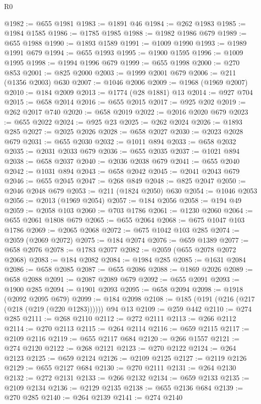 \begin{lexlean}{R0}
\begin{coremodule}
@1982 := @655 @1981
@1983 := @1891 @46
@1984 := @262 @1983
@1985 := @1984 @1585
@1986 := @1785 @1985
@1988 := @1982 @1986 @679
@1989 := @655 @1988
@1990 := @1893 @1589
@1991 := @1009 @1990
@1993 := @1989 @1991 @679
@1994 := @655 @1993
@1995 := @1900 @1595
@1996 := @1009 @1995
@1998 := @1994 @1996 @679
@1999 := @655 @1998
@2000 := @270 @853
@2001 := @825 @2000
@2003 := @1999 @2001 @679
@2006 := @211 (@1356 @2003) @630
@2007 := @1046 @2006
@2009 := @1968 (@1969 @2007)
@2010 := @184 @2009
@2013 := @1774 (@28 @1881) @13
@2014 := @927 @704
@2015 := @658 @2014
@2016 := @655 @2015
@2017 := @925 @202
@2019 := @262 @2017 @740
@2020 := @658 @2019
@2022 := @2016 @2020 @679
@2023 := @655 @2022
@2024 := @925 @23
@2025 := @262 @2024
@2026 := @1893 @285
@2027 := @2025 @2026
@2028 := @658 @2027
@2030 := @2023 @2028 @679
@2031 := @655 @2030
@2032 := @1011 @894
@2033 := @658 @2032
@2035 := @2031 @2033 @679
@2036 := @655 @2035
@2037 := @1021 @894
@2038 := @658 @2037
@2040 := @2036 @2038 @679
@2041 := @655 @2040
@2042 := @1031 @894
@2043 := @658 @2042
@2045 := @2041 @2043 @679
@2046 := @655 @2045
@2047 := @268 @849
@2048 := @825 @2047
@2050 := @2046 @2048 @679
@2053 := @211 (@1824 @2050) @630
@2054 := @1046 @2053
@2056 := @2013 (@1969 @2054)
@2057 := @184 @2056
@2058 := @194 @49
@2059 := @2058 @103
@2060 := @703 @1786
@2061 := @1230 @2060
@2064 := @655 @2061 @1808 @679
@2065 := @655 @2064
@2068 := @675 @1047 @103 @1786
@2069 := @2065 @2068
@2072 := @675 @1042 @103 @285
@2074 := @2059 (@2069 @2072)
@2075 := @184 @2074
@2076 := @659 @1389
@2077 := @658 @2076
@2078 := @1783 @2077
@2082 := @2059 (@655 @2078 @2072 @2068)
@2083 := @184 @2082
@2084 := @1984 @285
@2085 := @1631 @2084
@2086 := @658 @2085
@2087 := @655 @2086
@2088 := @1869 @2026
@2089 := @658 @2088
@2091 := @2087 @2089 @679
@2092 := @655 @2091
@2093 := @1900 @285
@2094 := @1901 @2093
@2095 := @658 @2094
@2098 := @1918 (@2092 @2095 @679)
@2099 := @184 @2098
@2108 := @185 (@191 (@216 (@217 (@218 (@219 (@220 @1283)))))) @94 @13
@2109 := @259 @442
@2110 := @274 @285
@2111 := @268 @2110
@2112 := @272 @2111
@2113 := @266 @2112
@2114 := @270 @2113
@2115 := @264 @2114
@2116 := @659 @2115
@2117 := @2109 @2116
@2119 := @655 @2117 @684
@2120 := @266 @1557
@2121 := @274 @2120
@2122 := @268 @2121
@2123 := @270 @2122
@2124 := @264 @2123
@2125 := @659 @2124
@2126 := @2109 @2125
@2127 := @2119 @2126
@2129 := @655 @2127 @684
@2130 := @270 @2111
@2131 := @264 @2130
@2132 := @272 @2131
@2133 := @266 @2132
@2134 := @659 @2133
@2135 := @2109 @2134
@2136 := @2129 @2135
@2138 := @655 @2136 @684
@2139 := @270 @285
@2140 := @264 @2139
@2141 := @274 @2140

\end{coremodule}
\end{lexlean}
